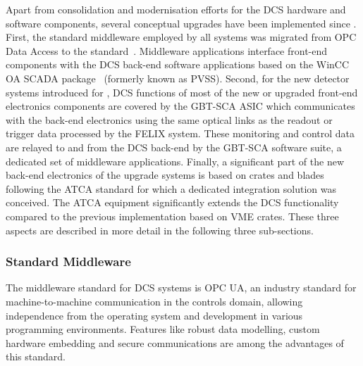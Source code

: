 \documentclass[cernpreprint, atlasdraft=false, UKenglish,british,orcidlogo, texmf, orcidlogo]{atlasdoc}
\begin{document}
Apart from consolidation and modernisation efforts for the \gls{DCS} hardware and software components, several conceptual upgrades have been implemented since \RunOne. First, the standard middleware employed by all systems was migrated from \gls{OPC} Data Access to the  standard~\cite{OPCUA}. Middleware applications interface front-end components with the \gls{DCS} back-end software applications based on the \gls{WinCC OA} \gls{SCADA} package~\cite{PVSS} (formerly known as PVSS). Second, for the new detector systems introduced for \RunThr, \gls{DCS} functions of most of the new or upgraded front-end electronics components are covered by the \gls{GBT-SCA} \gls{ASIC}\cite{GBTSCA,GBTSCA2} which communicates with the back-end electronics using the same optical links as the readout or trigger data processed by the \gls{FELIX} system. These monitoring and control data are relayed to and from the \gls{DCS} back-end by the \gls{GBT-SCA} software suite, a dedicated set of middleware applications. Finally, a significant part of the new back-end electronics of the upgrade systems is based on crates and blades following the \gls{ATCA} standard for which a dedicated integration solution was conceived. The \gls{ATCA} equipment significantly extends the \gls{DCS} functionality compared to the previous implementation based on \gls{VME} crates. These three aspects are described in more detail in the following three sub-sections.
 
\subsubsection{Standard Middleware  }
\label{TDAQ_DCS_OPCUA}
 
The middleware standard for \gls{DCS} systems is \gls{OPC UA}, an industry
standard for machine-to-machine communication in the controls domain, allowing independence from the operating system and development in various programming environments. Features like robust data modelling, 
custom hardware embedding and secure communications are among the advantages of this standard.
 
\end{document}
